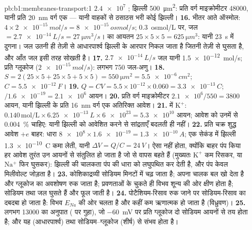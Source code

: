 \begin{solution}{pb:b1:membranes-transport:1}
$\num{2.4e7}$ ; झिल्ली \qty{500}{\micro m^2}: प्रति वर्ग
माइक्रोमीटर \num{48000}, यानी प्रति \qty{20}{nm} वर्ग एक --- यानी
वाहकों से ठसाठस भरी कोई झिल्ली।
\textbf{16.} भीतर आते ऑस्मोल: $4\times\qty{2e-15}{mol/s} =
\qty{8e-15}{osmol/s}$; \qty{0.3}{osmol/L} पर, जल
$= \qty{2.7e-14}{L/s} = \qty{27}{\micro m^3/s}$।  का आयतन
$25\times 5\times 5 = \qty{625}{\micro m^3}$: यानी \qty{23}{s} में दुगना।
जल उतनी ही तेज़ी से आधारपार्श्व झिल्ली के आरपार निकल जाता है जितनी तेज़ी
से घुसता है, और आँत जल इसी तरह सोखती है।
\textbf{17.} $\qty{2.7e-14}{L/s}$ जल यानी \qty{1.5e-12}{mol/s}; प्रति ग्लूकोज ($\qty{2e-15}{mol/s}$): लगभग 750 जल-अणु।
\textbf{18.} $S = 2(25\times 5 + 25\times 5 + 5\times 5) =
\qty{550}{\micro m^2} = \qty{5.5e-6}{cm^2}$; $C = \qty{5.5e-12}{F}$।
\textbf{19.} $Q = CV = 5.5\times 10^{-12}\times 0.060 =
\qty{3.3e-13}{C}$; $/\num{1.6e-19} = \num{2.1e6}$ आयन।
\textbf{20.} प्रति वर्ग माइक्रोमीटर $\num{2.1e6}/550 = 3800$ आयन, यानी झिल्ली के प्रति \qty{16}{nm} वर्ग एक अतिरिक्त आवेश।
\textbf{21.}  में $\mathrm{K^+}$: $0.140\,\mathrm{mol/L}\times
\qty{6.25e-13}{L}\times\num{6e23} = \num{5.3e10}$ आयन; आवेश को उनमें से
\qty{0.004}{\%} चाहिए: यानी झिल्ली को आवेशित करने से सांद्रताएँ बदलती ही
नहीं।
\textbf{22.} प्रति चक्र शुद्ध आवेश $+e$ बाहर: धारा $\num{8e8}\times
\num{1.6e-19} = \qty{1.3e-10}{A}$; एक सेकंड में झिल्ली
\qty{1.3e-10}{C} कमा लेती, यानी $\Delta V = Q/C = \qty{24}{V}$। ऐसा
नहीं होता, क्योंकि बाहर पंप किया हर आवेश तुरंत उन आयनों से संतुलित हो
जाता है जो  से वापस बहते हैं (मुख्यतः $\mathrm{K^+}$ कम रिसकर,
या $\mathrm{Na^+}$ फिर घुसकर): झिल्ली की चालकता पंप की धारा को लघुपथित
कर देती है, और पंप केवल मिलीवोल्ट जोड़ता है।
\textbf{23.} कोशिकाद्रव्यी सोडियम मिनटों में चढ़ जाता है;  अपना
चालक बल खो देता है और ग्लूकोज का अवशोषण रुक जाता है; प्रवणताओं के चुकते
ही विभव शून्य की ओर क्षीण होता है; सोडियम तथा जल घुसते हैं और
 फूल जाती है।
\textbf{24.} पोटैशियम-रिसाव रुक जाने पर सोडियम-रिसाव का दबदबा हो जाता
है: विभव $E_{Na}$ की ओर चलता है और कहीं कम ऋणात्मक हो जाता है
(विध्रुवण)।
\textbf{25.} लगभग \num{13000} का अनुपात ( पर गुहा), जो
\qty{-60}{mV} पर प्रति ग्लूकोज दो सोडियम आयनों से तय होता है; और यह
 (आधारपार्श्व) तथा सोडियम--ग्लूकोज 
(शीर्ष) से संभव होता है।
\end{solution}
